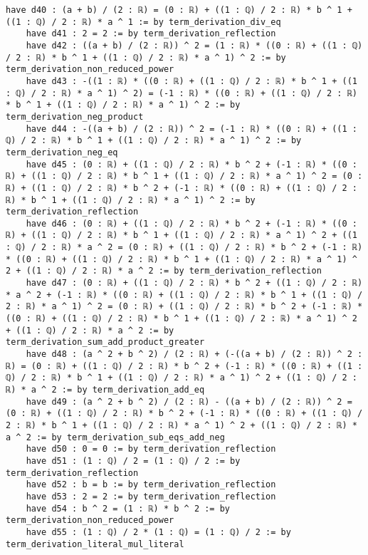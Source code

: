 \documentclass{article}
\begin{document}
\begin{tcolorbox}[colback=white!10, width=\linewidth]
\begin{lstlisting}[language=Lean4]
    have d40 : (a + b) / (2 : ℝ) = (0 : ℝ) + ((1 : ℚ) / 2 : ℝ) * b ^ 1 + ((1 : ℚ) / 2 : ℝ) * a ^ 1 := by term_derivation_div_eq
    have d41 : 2 = 2 := by term_derivation_reflection
    have d42 : ((a + b) / (2 : ℝ)) ^ 2 = (1 : ℝ) * ((0 : ℝ) + ((1 : ℚ) / 2 : ℝ) * b ^ 1 + ((1 : ℚ) / 2 : ℝ) * a ^ 1) ^ 2 := by term_derivation_non_reduced_power
    have d43 : -((1 : ℝ) * ((0 : ℝ) + ((1 : ℚ) / 2 : ℝ) * b ^ 1 + ((1 : ℚ) / 2 : ℝ) * a ^ 1) ^ 2) = (-1 : ℝ) * ((0 : ℝ) + ((1 : ℚ) / 2 : ℝ) * b ^ 1 + ((1 : ℚ) / 2 : ℝ) * a ^ 1) ^ 2 := by term_derivation_neg_product
    have d44 : -((a + b) / (2 : ℝ)) ^ 2 = (-1 : ℝ) * ((0 : ℝ) + ((1 : ℚ) / 2 : ℝ) * b ^ 1 + ((1 : ℚ) / 2 : ℝ) * a ^ 1) ^ 2 := by term_derivation_neg_eq
    have d45 : (0 : ℝ) + ((1 : ℚ) / 2 : ℝ) * b ^ 2 + (-1 : ℝ) * ((0 : ℝ) + ((1 : ℚ) / 2 : ℝ) * b ^ 1 + ((1 : ℚ) / 2 : ℝ) * a ^ 1) ^ 2 = (0 : ℝ) + ((1 : ℚ) / 2 : ℝ) * b ^ 2 + (-1 : ℝ) * ((0 : ℝ) + ((1 : ℚ) / 2 : ℝ) * b ^ 1 + ((1 : ℚ) / 2 : ℝ) * a ^ 1) ^ 2 := by term_derivation_reflection
    have d46 : (0 : ℝ) + ((1 : ℚ) / 2 : ℝ) * b ^ 2 + (-1 : ℝ) * ((0 : ℝ) + ((1 : ℚ) / 2 : ℝ) * b ^ 1 + ((1 : ℚ) / 2 : ℝ) * a ^ 1) ^ 2 + ((1 : ℚ) / 2 : ℝ) * a ^ 2 = (0 : ℝ) + ((1 : ℚ) / 2 : ℝ) * b ^ 2 + (-1 : ℝ) * ((0 : ℝ) + ((1 : ℚ) / 2 : ℝ) * b ^ 1 + ((1 : ℚ) / 2 : ℝ) * a ^ 1) ^ 2 + ((1 : ℚ) / 2 : ℝ) * a ^ 2 := by term_derivation_reflection
    have d47 : (0 : ℝ) + ((1 : ℚ) / 2 : ℝ) * b ^ 2 + ((1 : ℚ) / 2 : ℝ) * a ^ 2 + (-1 : ℝ) * ((0 : ℝ) + ((1 : ℚ) / 2 : ℝ) * b ^ 1 + ((1 : ℚ) / 2 : ℝ) * a ^ 1) ^ 2 = (0 : ℝ) + ((1 : ℚ) / 2 : ℝ) * b ^ 2 + (-1 : ℝ) * ((0 : ℝ) + ((1 : ℚ) / 2 : ℝ) * b ^ 1 + ((1 : ℚ) / 2 : ℝ) * a ^ 1) ^ 2 + ((1 : ℚ) / 2 : ℝ) * a ^ 2 := by term_derivation_sum_add_product_greater
    have d48 : (a ^ 2 + b ^ 2) / (2 : ℝ) + (-((a + b) / (2 : ℝ)) ^ 2 : ℝ) = (0 : ℝ) + ((1 : ℚ) / 2 : ℝ) * b ^ 2 + (-1 : ℝ) * ((0 : ℝ) + ((1 : ℚ) / 2 : ℝ) * b ^ 1 + ((1 : ℚ) / 2 : ℝ) * a ^ 1) ^ 2 + ((1 : ℚ) / 2 : ℝ) * a ^ 2 := by term_derivation_add_eq
    have d49 : (a ^ 2 + b ^ 2) / (2 : ℝ) - ((a + b) / (2 : ℝ)) ^ 2 = (0 : ℝ) + ((1 : ℚ) / 2 : ℝ) * b ^ 2 + (-1 : ℝ) * ((0 : ℝ) + ((1 : ℚ) / 2 : ℝ) * b ^ 1 + ((1 : ℚ) / 2 : ℝ) * a ^ 1) ^ 2 + ((1 : ℚ) / 2 : ℝ) * a ^ 2 := by term_derivation_sub_eqs_add_neg
    have d50 : 0 = 0 := by term_derivation_reflection
    have d51 : (1 : ℚ) / 2 = (1 : ℚ) / 2 := by term_derivation_reflection
    have d52 : b = b := by term_derivation_reflection
    have d53 : 2 = 2 := by term_derivation_reflection
    have d54 : b ^ 2 = (1 : ℝ) * b ^ 2 := by term_derivation_non_reduced_power
    have d55 : (1 : ℚ) / 2 * (1 : ℚ) = (1 : ℚ) / 2 := by term_derivation_literal_mul_literal

\end{lstlisting}
\end{tcolorbox}
\end{document}
